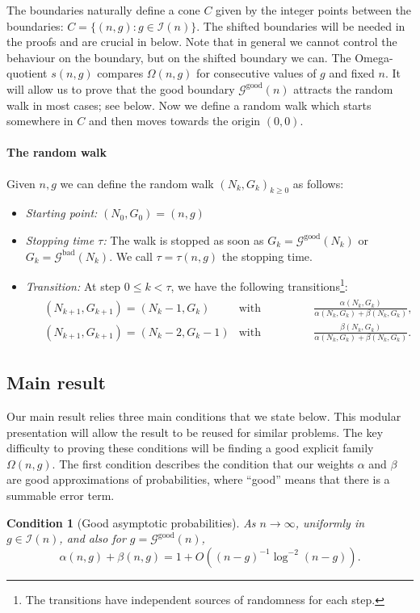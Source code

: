 \documentclass[a4paper,12pt]{article}
\newtheorem{condition}[theorem]{Condition}
\theoremstyle{definition}
\newcommand{\good}[1]{\mathcal{G}^{\text{good}}({#1})}
\newcommand{\goodG}{\good{n}}
\newcommand{\goodGNK}{\good{N_k}}
\newcommand{\bad}[1]{\mathcal{G}^{\text{bad}}({#1})}
\newcommand{\badGNK}{\bad{N_k}}
\newcommand{\interv}{\mathcal I(n)}
\newcommand{\gstrict}{\ensuremath{g\in \interv}}
\begin{document}
The boundaries naturally define a cone $C$ given by the integer points between the boundaries:
$C = \{ (n,g) : g \in \interv \}.$
The shifted boundaries will be needed in the proofs and are crucial in  below. Note that in general we cannot control the behaviour on the boundary, but on the shifted boundary we can. 
The Omega-quotient $s(n,g)$ compares $\Omega(n,g)$ for consecutive values of $g$ and fixed $n$. It will allow us to prove that the good boundary $\goodG$ attracts the random walk in most cases; see %
 below. 
Now we define a random walk which starts somewhere in $C$ and then moves towards the origin $(0,0)$.

\paragraph{The random walk}
Given $n,g$ we can define  the random walk $(N_k,G_k)_{k\geq 0}$ as follows:

\begin{itemize}
    \item \emph{Starting point:} $(N_0,G_0)=(n,g)$
    \item \emph{Stopping time $\tau$:} The walk is stopped as soon as $G_k=\goodGNK$ or $G_k=\badGNK$. We call $\tau=\tau(n,g)$ the stopping time.
    
    \item \emph{Transition:} At step $0\leq k<\tau$, we have the following transitions\footnote{The transitions have independent sources of randomness for each step.}:
    \begin{align}
    \label{eq:probarw}
    \begin{aligned}
    &(N_{k+1},G_{k+1})= (N_{k}-1,G_{k}) &\text{with probability} &\quad \frac{\alpha(N_k,G_k)}{\alpha(N_k,G_k)+\beta(N_k,G_k)},\\
    &(N_{k+1},G_{k+1})= (N_{k}-2,G_{k}-1)&\text{with probability} &\quad \frac{\beta(N_k,G_k)}{\alpha(N_k,G_k)+\beta(N_k,G_k)}.
    \end{aligned}
    \end{align}
\end{itemize}

\subsection{Main result}
Our main result relies three main conditions that we state below. This modular presentation will allow the result to be reused for similar problems. The key difficulty to proving these conditions will be finding a good explicit family $\Omega(n,g)$.
The first condition describes the condition that our weights $\alpha$ and $\beta$ are good approximations of probabilities, where ``good'' means that there is a summable error term. 
\begin{condition}[Good asymptotic probabilities]\label{assum_alpha_beta}
As $n\to\infty$, uniformly in \gstrict, and also for $g=\goodG$, 
\[\alpha(n,g)+\beta(n,g)=1+O\left((n-g)^{-1}\log^{-2}(n-g)\right).\]
\end{condition}
\end{document}
